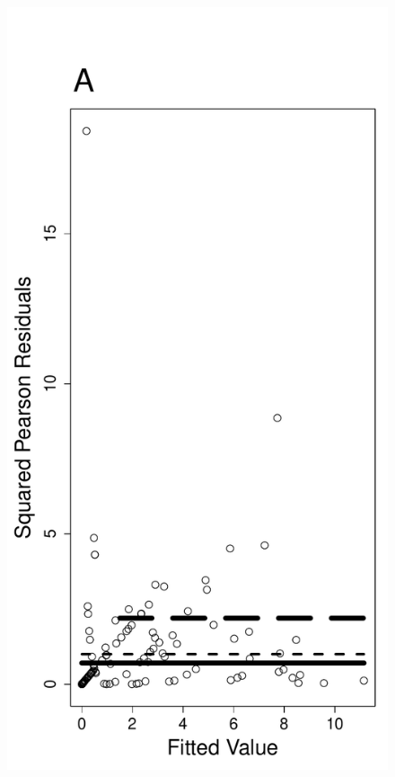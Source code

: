 \documentclass[12pt, titlepage]{article}\usepackage[]{graphicx}\usepackage[]{color}
\makeatletter
\def\maxwidth{ %
  \ifdim\Gin@nat@width>\linewidth
    \linewidth
  \else
    \Gin@nat@width
  \fi
}
\makeatother
\begin{document}
		\begin{figure}[H]
		\begin{center}
		\includegraphics[width = .40\maxwidth]{PearResids4Overdisp}

\end{center}
\end{figure}
\end{document}
